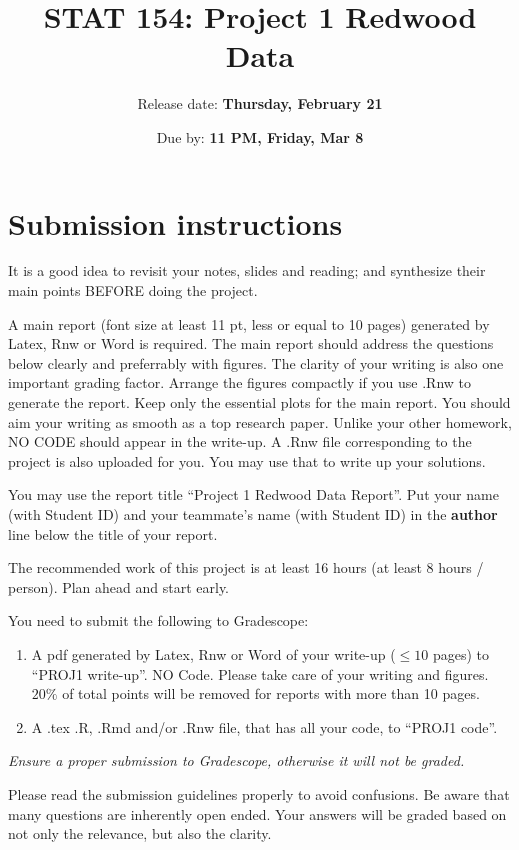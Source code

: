\documentclass[11pt]{article}
\title{STAT 154: Project 1 Redwood Data}
\author{Release date: \textbf{Thursday, February 21}}
\date{Due by: \textbf{11 PM, Friday, Mar 8}}
\begin{document}


\maketitle

\section*{Submission instructions}
It is a good idea to revisit your notes, slides and reading;
and synthesize their main points BEFORE doing the
project.

A main report (font size at least 11 pt, less or equal to 10 pages) generated by Latex, Rnw or Word is required. 
The main report should address the questions below clearly and preferrably with figures. The clarity of your writing is also one important grading factor.  
Arrange the figures compactly if you use .Rnw to generate the report. Keep only the essential plots for the main report. You should aim your writing as smooth as a top research paper. Unlike your other homework, NO CODE should appear in the write-up. 
A .Rnw file corresponding to the project is also uploaded for you. You may use that to write up your solutions.

You may use the report title ``Project 1 Redwood Data Report''.
Put your name (with Student ID) and your teammate's name (with Student ID) in the \textbf{author} line below the title of your report.

The recommended work of this project is at least 16 hours (at least 8 hours / person). Plan ahead and start early. 
\newline


You need to submit the following to Gradescope:
\begin{enumerate}
\item A pdf generated by Latex, Rnw or Word of your write-up ($\leq 10$ pages) to ``PROJ1 write-up''. NO Code. Please take care of your writing and figures. $20\%$ of total points will be removed for reports with more than 10 pages.
\item A .tex .R, .Rmd and/or .Rnw file, that has all your code, to ``PROJ1 code''.
\end{enumerate}
\emph{Ensure a proper submission to Gradescope, otherwise it will not be graded. }

\newpage

Please read the submission guidelines properly to avoid confusions. Be aware that many questions are inherently open ended. Your answers will be graded based on not only the relevance, but also the clarity.
\end{document}
